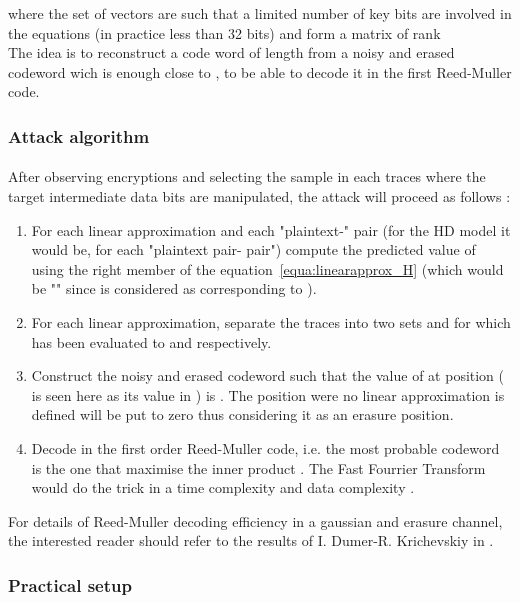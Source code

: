 \documentclass[11pt,a4paper]{article}
\begin{document}
{{{{{{{{{where the set of vectors  are such that a limited number  of key bits are involved in the equations (in practice less than 32 bits) and form a matrix of rank 
 \\
The idea is to reconstruct a code word  of length  from a noisy and erased codeword  wich is enough close to , to be able to decode it in the first Reed-Muller code. 

\subsubsection{Attack algorithm}
\label{subsubsec:MLPAalgorithm}
\paragraph{}
After observing  encryptions and selecting the sample  in each traces  where the target intermediate data bits are manipulated, the attack will proceed as follows :
\begin{enumerate}
\item For each linear approximation and each "plaintext-" pair (for the HD model it would be, for each "plaintext pair- pair")
compute the predicted value of  using the right member of the equation~\ref{equa:linearapprox_H}
(which would be "" since  is considered as corresponding to ).
\item For each linear approximation, separate the traces into two sets  and  for which  has been evaluated to  and  respectively. 
\item Construct the noisy and erased codeword   such that the value of  at position  ( is seen here as its value in ) is 
. The position were no linear approximation is defined will be put to zero thus considering it 
as an erasure position. 
\item Decode  in the first order Reed-Muller code, i.e. the most probable codeword  is the one that maximise the inner product . 
The Fast Fourrier Transform would do the trick in a time complexity  and data complexity .
\end{enumerate}
For details of Reed-Muller decoding efficiency in a gaussian and erasure channel, the interested reader should refer to the results of I. Dumer-R. Krichevskiy in 
\cite{DumerKrichevskiy00}. 

\subsubsection{Practical setup} 
\label{subsubsec:practicalsetup}
}}}}}}}}}
\end{document}
